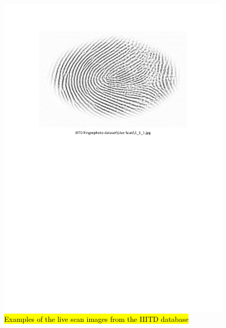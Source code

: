\documentclass[review]{elsarticle}
\begin{document}
		\begin{figure}[!h]
			\centering
			\includegraphics[page=1,scale=.7,trim=2cm 17.5cm 2cm 2cm,clip]{IIITD_dataset.pdf}
			\caption{\hl{Examples of the live scan images from the IIITD database}}
			\label{fig:IIITD_fingerprint}
		\end{figure}
\end{document}
